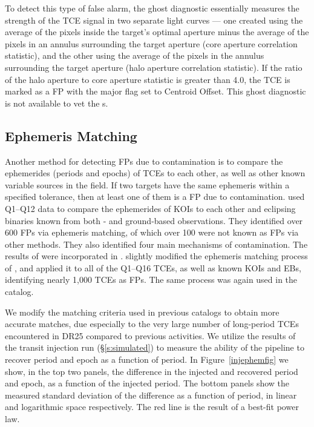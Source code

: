 To detect this type of false alarm, the ghost diagnostic essentially measures the strength of the TCE signal in two separate light curves --- one created using the average of the pixels inside the target's optimal aperture minus the average of the pixels in an annulus surrounding the target aperture (core aperture correlation statistic), and the other using the average of the pixels in the annulus surrounding the target aperture (halo aperture correlation statistic). If the ratio of the halo aperture to core aperture statistic is greater than 4.0, the TCE is marked as a FP with the major flag set to Centroid Offset. This ghost diagnostic is not available to vet the \scrtce s. 



\subsection{Ephemeris Matching}
\label{ephemmatchsec}
\label{s:ephemmatch}

Another method for detecting FPs due to contamination is to compare the ephemerides (periods and epochs) of TCEs to each other, as well as other known variable sources in the \kepler{} field. If two targets have the same ephemeris within a specified tolerance, then at least one of them is a FP due to contamination. \citet{Coughlin2014a} used Q1--Q12 data to compare the ephemerides of KOIs to each other and eclipsing binaries known from both \kepler{}- and ground-based observations. They identified over 600 FPs via ephemeris matching, of which over 100 were not known as FPs via other methods. They also identified four main mechanisms of contamination. The results of \citet{Coughlin2014a} were incorporated in \citet[][see \S3.3]{Rowe2015a}. \citet[][see \S5.3]{Mullally2015cat} slightly modified the ephemeris matching process of \citet{Coughlin2014a}, and applied it to all of the Q1--Q16 TCEs, as well as known KOIs and EBs, identifying nearly 1,000 TCEs as FPs. The same process was again used in the \citet{Coughlin2016} catalog.

We modify the matching criteria used in previous catalogs to obtain more accurate matches, due especially to the very large number of long-period TCEs encountered in DR25 compared to previous activities. We utilize the results of the transit injection run (\S\ref{s:simulated}) to measure the ability of the \kepler{} pipeline to recover period and epoch as a function of period. In Figure~\ref{injephemfig} we show, in the top two panels, the difference in the injected and recovered period and epoch, as a function of the injected period. The bottom panels show the measured standard deviation of the difference as a function of period, in linear and logarithmic space respectively. The red line is the result of a best-fit power law.

